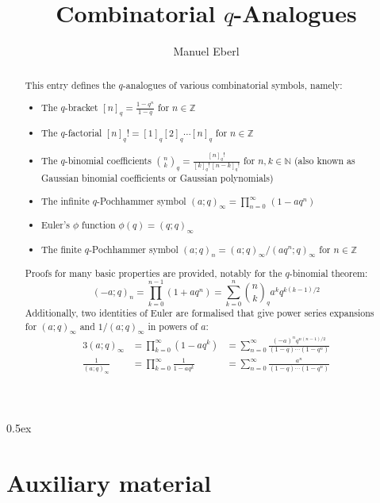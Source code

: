 \documentclass[11pt,a4paper]{article}
\begin{document}
\title{Combinatorial $q$-Analogues}
\author{Manuel Eberl}
\maketitle

\begin{abstract}
This entry defines the $q$-analogues of various combinatorial symbols, namely:
\begin{itemize}
  \item The $q$-bracket $[n]_q = \frac{1-q^n}{1-q}$ for $n\in\mathbb{Z}$
  \item The $q$-factorial $[n]_q! = [1]_q [2]_q \cdots [n]_q$ for $n\in\mathbb{Z}$
  \item The $q$-binomial coefficients $\binom{n}{k}_{\!q} = \frac{[n]_q!}{[k]_q!\,[n-k]_q!}$ for $n,k\in\mathbb{N}$ (also known as
        Gaussian binomial coefficients or Gaussian polynomials)
  \item The infinite $q$-Pochhammer symbol $(a; q)_\infty = \prod_{n=0}^\infty\, (1 - aq^n)$
  \item Euler's $\phi$ function $\phi(q) = (q; q)_\infty$
  \item The finite $q$-Pochhammer symbol $(a; q)_n = (a; q)_\infty / (aq^n; q)_\infty$ for $n\in\mathbb{Z}$
\end{itemize}
Proofs for many basic properties are provided, notably for the $q$-binomial theorem:
\[(-a; q)_n = \prod_{k=0}^{n-1} (1 + aq^n) = \sum_{k=0}^n \binom{n}{k}_{\!\!q} a^k q^{k(k-1)/2} \]
Additionally, two identities of Euler are formalised that give power series expansions for
$(a; q)_\infty$ and $1/(a; q)_\infty$ in powers of $a$:
\begin{alignat*}{3}
(a; q)_\infty &{}= \prod_{k=0}^\infty (1 - aq^k) &{}= 
      \sum_{n=0}^\infty \frac{(-a)^n q^{n(n-1)/2}}{(1-q) \cdots (1-q^n)}\\
\frac{1}{(a; q)_\infty} &{}= \prod_{k=0}^\infty \frac{1}{1 - aq^k} &{}= 
      \sum_{n=0}^\infty \frac{a^n}{(1-q)\cdots(1-q^n)}
\end{alignat*}

\end{abstract}

\newpage
\tableofcontents

\newpage
\parindent 0pt\parskip 0.5ex

\section{Auxiliary material}



\raggedright
\nocite{andrews1999}



\end{document}
